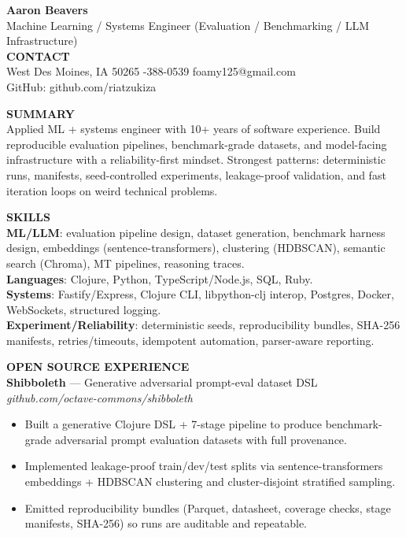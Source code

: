 \documentclass[10pt]{article}
\begin{document}
{\LARGE \textbf{Aaron Beavers}}\\
Machine Learning / Systems Engineer (Evaluation / Benchmarking / LLM Infrastructure)\\

\vspace{2pt}
\textbf{CONTACT}\\
West Des Moines, IA 50265 \;\;\textbar\;-388-0539 \;\;\textbar\;\; foamy125@gmail.com\\
GitHub: github.com/riatzukiza

\vspace{4pt}
\textbf{SUMMARY}\\
Applied ML + systems engineer with 10+ years of software experience. Build reproducible evaluation pipelines, benchmark-grade datasets, and model-facing infrastructure with a reliability-first mindset. Strongest patterns: deterministic runs, manifests, seed-controlled experiments, leakage-proof validation, and fast iteration loops on weird technical problems.

\vspace{2pt}
\textbf{SKILLS}\\
\textbf{ML/LLM}: evaluation pipeline design, dataset generation, benchmark harness design, embeddings (sentence-transformers), clustering (HDBSCAN), semantic search (Chroma), MT pipelines, reasoning traces.\\
\textbf{Languages}: Clojure, Python, TypeScript/Node.js, SQL, Ruby.\\
\textbf{Systems}: Fastify/Express, Clojure CLI, libpython-clj interop, Postgres, Docker, WebSockets, structured logging.\\
\textbf{Experiment/Reliability}: deterministic seeds, reproducibility bundles, SHA-256 manifests, retries/timeouts, idempotent automation, parser-aware reporting.

\vspace{4pt}
\textbf{OPEN SOURCE EXPERIENCE}\\

\textbf{Shibboleth} --- Generative adversarial prompt-eval dataset DSL \hfill \textit{github.com/octave-commons/shibboleth}\\
\vspace{-6pt}
\begin{itemize}
  \setlength\itemsep{-2pt}
  \setlength\parskip{0pt}
  \setlength\parsep{0pt}
  \item Built a generative Clojure DSL + 7-stage pipeline to produce benchmark-grade adversarial prompt evaluation datasets with full provenance.
  \item Implemented leakage-proof train/dev/test splits via sentence-transformers embeddings + HDBSCAN clustering and cluster-disjoint stratified sampling.
  \item Emitted reproducibility bundles (Parquet, datasheet, coverage checks, stage manifests, SHA-256) so runs are auditable and repeatable.
\end{itemize}
\end{document}
